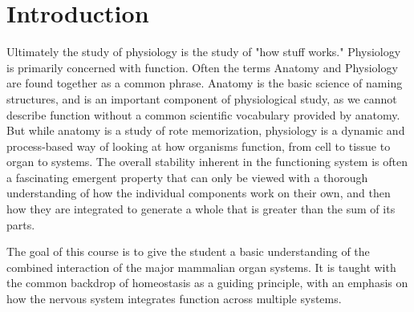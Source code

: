 \documentclass[10pt,twoside,twocolumn]{article}
\begin{document}
\selectfont %


\section{Introduction}
Ultimately the study of physiology is the study of "how stuff works." Physiology is primarily concerned with function. Often the terms Anatomy and Physiology are found together as a common phrase. Anatomy is the basic science of naming structures, and is an important component of physiological study, as we cannot describe function without a common scientific vocabulary provided by anatomy. But while anatomy is a study of rote memorization, physiology is a dynamic and process-based way of looking at how organisms function, from cell to tissue to organ to systems. The overall stability inherent in the functioning system is often a fascinating emergent property that can only be viewed with a thorough understanding of how the individual components work on their own, and then how they are integrated to generate a whole that is greater than the sum of its parts. 

The goal of this course is to give the student a basic understanding of the combined interaction of the major mammalian organ systems. It is taught with the common backdrop of homeostasis as a guiding principle, with an emphasis on how the nervous system integrates function across multiple systems. 
\end{document}
